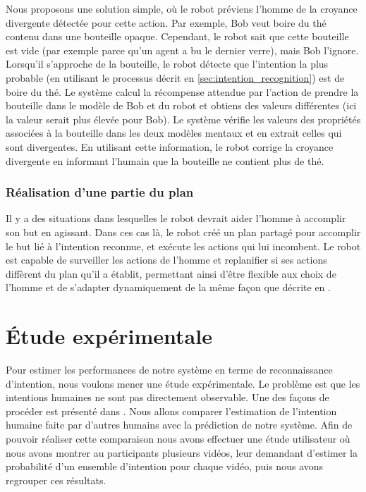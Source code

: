 \documentclass[a4paper,11pt,twoside]{StyleThese}
\begin{document}
Nous proposons une solution simple, où le robot préviens l'homme de la croyance divergente détectée pour cette action. Par exemple, Bob veut boire du thé contenu dans une bouteille opaque. Cependant, le robot sait que cette bouteille est vide (par exemple parce qu'un agent a bu le dernier verre), mais Bob l'ignore. Lorsqu'il s'approche de la bouteille, le robot détecte que l'intention la plus probable (en utilisant le processus décrit en  \ref{sec:intention_recognition}) est de boire du thé. Le système calcul la récompense attendue par l'action de prendre la bouteille dans le modèle de Bob et du robot et obtiens des valeurs différentes (ici la valeur serait plus élevée pour Bob). Le système vérifie les valeurs des propriétés associées à la bouteille dans les deux modèles mentaux et en extrait celles qui sont divergentes. En utilisant cette information, le robot corrige la croyance divergente en informant l'humain que la bouteille ne contient plus de thé.


\subsubsection{Réalisation d'une partie du plan}
\label{robot_acts}
Il y a des situations dans lesquelles le robot devrait aider l'homme à accomplir son but en agissant. Dans ces cas là, le robot créé un plan partagé pour accomplir le but lié à l'intention reconnue, et exécute les actions qui lui incombent. Le robot est capable de surveiller les actions de l'homme et replanifier si ses actions diffèrent du plan qu'il a établit, permettant ainsi d'être flexible aux choix de l'homme et de s'adapter dynamiquement de la même façon que décrite en \cite{fioreiser2014}.
\vspace{-5pt}


\section{Étude expérimentale}
Pour estimer les performances de notre système en terme de reconnaissance d'intention, nous voulons mener une étude expérimentale. Le problème est que les intentions humaines ne sont pas directement observable. Une des façons de procéder est présenté dans \cite{baker2014modeling}. Nous allons comparer l'estimation de l'intention humaine faite par d'autres humains avec la prédiction de notre système. Afin de pouvoir réaliser cette comparaison nous avons effectuer une étude utilisateur où nous avons montrer au participants plusieurs vidéos, leur demandant d'estimer la probabilité d'un ensemble d'intention pour chaque vidéo, puis nous avons regrouper ces résultats.
\end{document}
